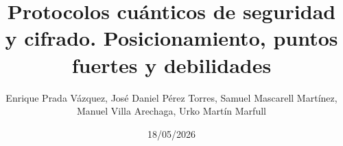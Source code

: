 \documentclass[11pt,a4paper,spanish]{book}
\title{Protocolos cuánticos de seguridad y cifrado. Posicionamiento, puntos fuertes y debilidades}
\author{Enrique Prada Vázquez, José Daniel Pérez Torres, Samuel Mascarell Martínez, Manuel Villa Arechaga, Urko Martín Marfull}
\date{18/05/2026}
\begin{document}
\renewcommand{\listfigurename}{Índice de figuras}
\renewcommand{\listtablename}{Índice de tablas}
\renewcommand{\contentsname}{Índice de contenidos}
\renewcommand{\figurename}{Figura}
\renewcommand{\tablename}{Tabla}

\maketitle
\frontmatter
\tableofcontents
\listoftables




\mainmatter








\end{document}
